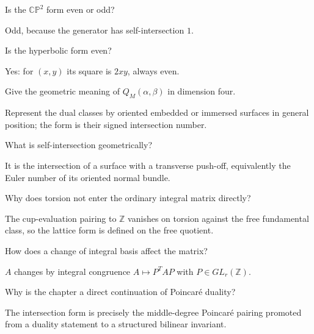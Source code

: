 \begin{problem}
Is the $\mathbb{CP}^2$ form even or odd?
\end{problem}
\begin{solution}
Odd, because the generator has self-intersection $1$.
\end{solution}

\begin{problem}
Is the hyperbolic form even?
\end{problem}
\begin{solution}
Yes: for $(x,y)$ its square is $2xy$, always even.
\end{solution}

\begin{problem}
Give the geometric meaning of $Q_M(\alpha,\beta)$ in dimension four.
\end{problem}
\begin{solution}
Represent the dual classes by oriented embedded or immersed surfaces in general position; the form is their signed intersection number.
\end{solution}

\begin{problem}
What is self-intersection geometrically?
\end{problem}
\begin{solution}
It is the intersection of a surface with a transverse push-off, equivalently the Euler number of its oriented normal bundle.
\end{solution}

\begin{problem}
Why does torsion not enter the ordinary integral matrix directly?
\end{problem}
\begin{solution}
The cup-evaluation pairing to $\mathbb Z$ vanishes on torsion against the free fundamental class, so the lattice form is defined on the free quotient.
\end{solution}

\begin{problem}
How does a change of integral basis affect the matrix?
\end{problem}
\begin{solution}
$A$ changes by integral congruence $A\mapsto P^{T}AP$ with $P\in GL_r(\mathbb Z)$.
\end{solution}

\begin{problem}
Why is the chapter a direct continuation of Poincaré duality?
\end{problem}
\begin{solution}
The intersection form is precisely the middle-degree Poincaré pairing promoted from a duality statement to a structured bilinear invariant.
\end{solution}

